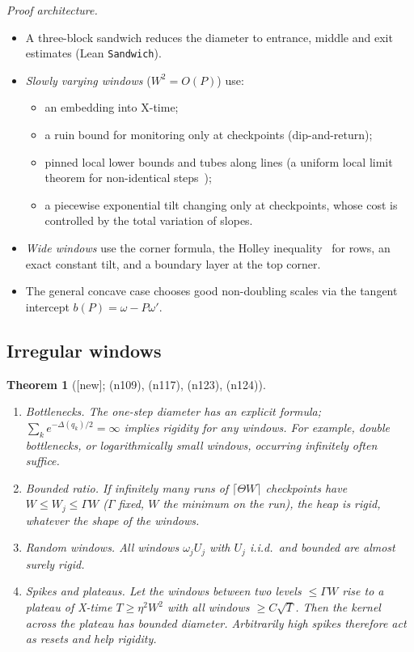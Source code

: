 \documentclass[11pt]{article}
\newtheorem{theorem}{Theorem}[section]
\theoremstyle{definition}
\theoremstyle{remark}
\newcommand{\lean}[1]{\texttt{#1}}
\newcommand{\status}[1]{\textsf{[#1]}}
\newcommand{\note}[1]{\textsf{(n#1)}}
\begin{document}
\noindent\emph{Proof architecture.}
\begin{itemize}
\item A three-block sandwich reduces the diameter to entrance, middle and exit estimates (Lean \lean{Sandwich}).
\item \emph{Slowly varying windows} ($W^2=O(P)$) use:
  \begin{itemize}
  \item an embedding into X-time;
  \item a ruin bound for monitoring only at checkpoints (dip-and-return);
  \item pinned local lower bounds and tubes along lines (a uniform local limit theorem for non-identical steps~\cite{Petrov75});
  \item a piecewise exponential tilt changing only at checkpoints, whose cost is controlled by the total variation of slopes.
  \end{itemize}
\item \emph{Wide windows} use the corner formula, the Holley inequality~\cite{Holley74} for rows, an exact constant tilt, and a boundary layer at the top corner.
\item The general concave case chooses good non-doubling scales via the tangent intercept $b(P)=\omega-P\omega'$.
\end{itemize}

\subsection{Irregular windows}

\begin{theorem}[\status{new}; \note{109}, \note{117}, \note{123}, \note{124}]\label{thm:irregular}
\leavevmode
\begin{enumerate}
\item \emph{Bottlenecks.} The one-step diameter has an explicit formula; $\sum_ke^{-\Delta(q_k)/2}=\infty$ implies rigidity for any windows. For example, double bottlenecks, or logarithmically small windows, occurring infinitely often suffice.
\item \emph{Bounded ratio.} If infinitely many runs of $\lceil\Theta W\rceil$ checkpoints have $W\le W_j\le\Gamma W$ ($\Gamma$ fixed, $W$ the minimum on the run), the heap is rigid, whatever the shape of the windows.
\item \emph{Random windows.} All windows $\omega_jU_j$ with $U_j$ i.i.d.\ and bounded are almost surely rigid.
\item \emph{Spikes and plateaus.} Let the windows between two levels $\le\Gamma W$ rise to a plateau of X-time $T\ge\eta^2W^2$ with all windows $\ge C\sqrt T$. Then the kernel across the plateau has bounded diameter. Arbitrarily high spikes therefore act as resets and help rigidity.
\end{enumerate}
\end{theorem}
\end{document}
